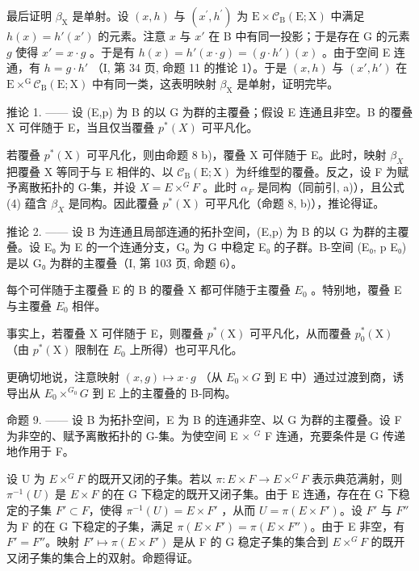 最后证明 \(\beta_{\mathrm{X}}\) 是单射。设 \((x,h)\) 与 \((x^{\prime},h^{\prime})\) 为 \(\mathrm{E}\times \mathcal{C}_{\mathrm{B}}(\mathrm{E};\mathrm{X})\) 中满足 \(h(x) = h'(x')\) 的元素。注意 \(x\) 与 \(x'\) 在 B 中有同一投影；于是存在 G 的元素 \(g\) 使得 \(x' = x\cdot g\) 。于是有 \(h(x) = h'(x\cdot g) = (g\cdot h')(x)\) 。由于空间 E 连通，有 \(h = g\cdot h'\) （I, 第 34 页, 命题 11 的推论 1）。于是 \((x,h)\) 与 \((x',h')\) 在 \(\mathrm{E}\times^{\mathrm{G}}\mathcal{C}_{\mathrm{B}}(\mathrm{E};\mathrm{X})\) 中有同一类，这表明映射 \(\beta_{\mathrm{X}}\) 是单射，证明完毕。

推论 1. —— 设 (E,p) 为 B 的以 G 为群的主覆叠；假设 E 连通且非空。B 的覆叠 X 可伴随于 E，当且仅当覆叠 \(p^{*}(X)\) 可平凡化。

若覆叠 \(p^{*}(\mathrm{X})\) 可平凡化，则由命题 8 b)，覆叠 X 可伴随于 E。此时，映射 \(\beta_{X}\) 把覆叠 X 等同于与 E 相伴的、以 \(\mathcal{C}_{\mathrm{B}}(\mathrm{E};\mathrm{X})\) 为纤维型的覆叠。反之，设 F 为赋予离散拓扑的 G-集，并设 \(X = E \times^{G} F\) 。此时 \(\alpha_{F}\) 是同构（同前引, a)），且公式 (4) 蕴含 \(\beta_{X}\) 是同构。因此覆叠 \(p^{*}(\mathrm{X})\) 可平凡化（命题 8, b)），推论得证。

推论 2. —— 设 B 为连通且局部连通的拓扑空间，(E,p) 为 B 的以 G 为群的主覆叠。设 E₀ 为 E 的一个连通分支，G₀ 为 G 中稳定 E₀ 的子群。B-空间 (E₀, p \textbar{} E₀) 是以 G₀ 为群的主覆叠（I, 第 103 页, 命题 6）。

每个可伴随于主覆叠 E 的 B 的覆叠 X 都可伴随于主覆叠 \(E_{0}\) 。特别地，覆叠 E 与主覆叠 \(E_{0}\) 相伴。

事实上，若覆叠 X 可伴随于 E，则覆叠 \(p^{*}(\mathrm{X})\) 可平凡化，从而覆叠 \(p_{0}^{*}(\mathrm{X})\) （由 \(p^{*}(\mathrm{X})\) 限制在 \(E_{0}\) 上所得）也可平凡化。

更确切地说，注意映射 \((x,g)\mapsto x\cdot g\) （从 \(E_{0}\times G\) 到 E 中）通过过渡到商，诱导出从 \(E_{0}\times^{G_{0}}G\) 到 E 上的主覆叠的 B-同构。

命题 9. —— 设 B 为拓扑空间，E 为 B 的连通非空、以 G 为群的主覆叠。设 F 为非空的、赋予离散拓扑的 G-集。为使空间 E × \(^{G}\) F 连通，充要条件是 G 传递地作用于 F。

设 U 为 \(E \times^{G} F\) 的既开又闭的子集。若以 \(\pi: E \times F \to E \times^{G} F\) 表示典范满射，则 \(\pi^{-1}(U)\) 是 \(E \times F\) 的在 G 下稳定的既开又闭子集。由于 E 连通，存在在 G 下稳定的子集 \(F' \subset F\)，使得 \(\pi^{-1}(U) = E \times F'\) ，从而 \(U = \pi(E \times F')\)。设 \(F'\) 与 \(F''\) 为 F 的在 G 下稳定的子集，满足 \(\pi(E \times F') = \pi(E \times F'')\)。由于 E 非空，有 \(F' = F''\)。映射 \(F' \mapsto \pi(E \times F')\) 是从 F 的 G 稳定子集的集合到 \(E \times^{G} F\) 的既开又闭子集的集合上的双射。命题得证。


